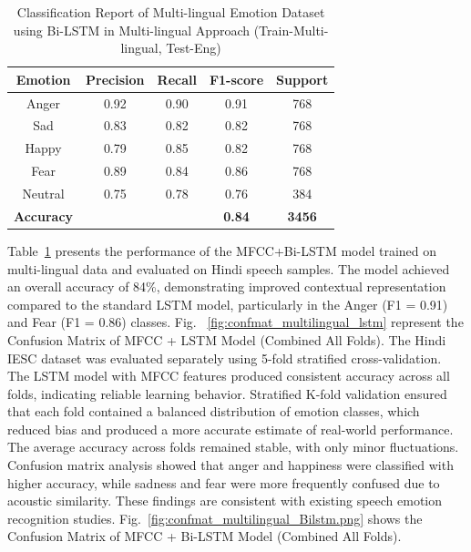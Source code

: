\documentclass[runningheads]{llncs}
\begin{document}
\begin{table}[!htbp]
\caption{Classification Report of Multi-lingual Emotion Dataset using Bi-LSTM in Multi-lingual Approach (Train-Multi-lingual, Test-Eng)}
\centering
\begin{tabular}{ccccc}
\toprule
\textbf{Emotion} & \textbf{Precision} & \textbf{Recall} & \textbf{F1-score} & \textbf{Support} \\
\midrule
Anger   & 0.92 & 0.90 & 0.91 & 768 \\
Sad     & 0.83 & 0.82 & 0.82 & 768 \\
Happy   & 0.79 & 0.85 & 0.82 & 768 \\
Fear    & 0.89 & 0.84 & 0.86 & 768 \\
Neutral & 0.75 & 0.78 & 0.76 & 384 \\
\midrule
\textbf{Accuracy} &  &  & \textbf{0.84} & \textbf{3456} \\
\bottomrule
\end{tabular}
\label{tab:multilingual_bilstm_test_hindi}
\end{table}
Table~\ref{tab:multilingual_bilstm_test_hindi} presents the performance of the MFCC+Bi-LSTM model trained on multi-lingual data and evaluated on Hindi speech samples. The model achieved an overall accuracy of 84\%, demonstrating improved contextual representation compared to the standard LSTM model, particularly in the Anger (F1 = 0.91) and Fear (F1 = 0.86) classes. Fig. ~\ref{fig:confmat_multilingual_lstm} represent the Confusion Matrix of MFCC + LSTM Model (Combined All Folds).
The Hindi IESC dataset was evaluated separately using 5-fold stratified cross-validation. The LSTM model with MFCC features produced consistent accuracy across all folds, indicating reliable learning behavior. Stratified K-fold validation ensured that each fold contained a balanced distribution of emotion classes, which reduced bias and produced a more accurate estimate of real-world performance. The average accuracy across folds remained stable, with only minor fluctuations. Confusion matrix analysis showed that anger and happiness were classified with higher accuracy, while sadness and fear were more frequently confused due to acoustic similarity. These findings are consistent with existing speech emotion recognition studies. Fig.~\ref{fig:confmat_multilingual_Bilstm.png} shows the Confusion Matrix of MFCC + Bi-LSTM Model (Combined All Folds).
\end{document}
